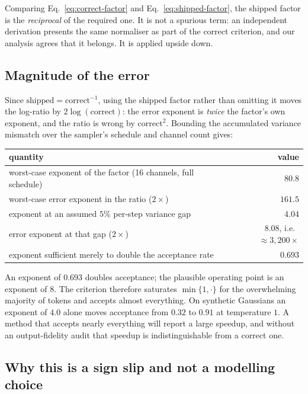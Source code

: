 Comparing Eq.~\ref{eq:correct-factor} and Eq.~\ref{eq:shipped-factor}, the shipped factor is the
\emph{reciprocal} of the required one. It is not a spurious term: an independent derivation
\citep{zhang2025fastardiff} presents the same normaliser as part of the correct criterion, and our
analysis agrees that it belongs. It is applied upside down.

\subsection{Magnitude of the error}

Since $\text{shipped} = \text{correct}^{-1}$, using the shipped factor rather than omitting it moves
the log-ratio by $2\log(\text{correct})$: the error exponent is \emph{twice} the factor's own
exponent, and the ratio is wrong by $\text{correct}^2$. Bounding the accumulated variance mismatch
over the sampler's schedule and channel count gives:

\begin{center}
\small
\begin{tabular}{lr}
\toprule
quantity & value \\
\midrule
worst-case exponent of the factor (16 channels, full schedule) & $80.8$ \\
worst-case error exponent in the ratio ($2\times$) & $\mathbf{161.5}$ \\
exponent at an assumed $5\%$ per-step variance gap & $4.04$ \\
error exponent at that gap ($2\times$) & $8.08$, i.e.\ $\approx 3{,}200\times$ \\
exponent sufficient merely to double the acceptance rate & $0.693$ \\
\bottomrule
\end{tabular}
\end{center}

An exponent of $0.693$ doubles acceptance; the plausible operating point is an exponent of $8$. The
criterion therefore saturates $\min\{1,\cdot\}$ for the overwhelming majority of tokens and accepts
almost everything. On synthetic Gaussians an exponent of $4.0$ alone moves acceptance from $0.32$ to
$0.91$ at temperature $1$. A method that accepts nearly everything will report a large speedup, and
without an output-fidelity audit that speedup is indistinguishable from a correct one.

\subsection{Why this is a sign slip and not a modelling choice}

